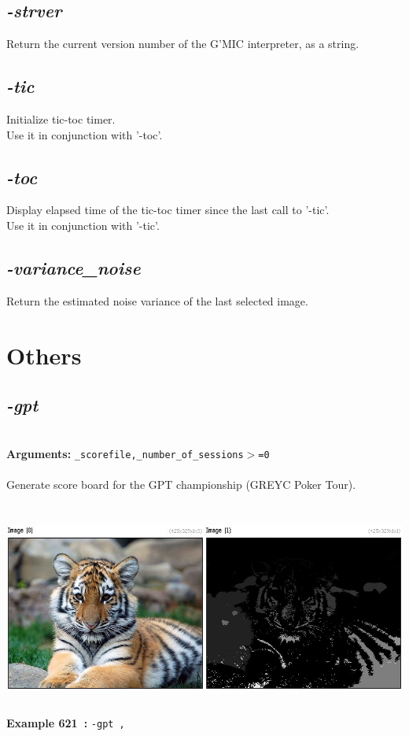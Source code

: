 \documentclass[a4paper,11pt,twoside]{book}
\begin{document}
\subsection{\emph{-strver} }\vspace*{-0.5em}
Return the current version number of the G'MIC interpreter, as a string.


\subsection{\emph{-tic} }\vspace*{-0.5em}
Initialize tic-toc timer.
~\\Use it in conjunction with '-toc'.


\subsection{\emph{-toc} }\vspace*{-0.5em}
Display elapsed time of the tic-toc timer since the last call to '-tic'.
~\\Use it in conjunction with '-tic'.


\subsection{\emph{-variance\_noise} }\vspace*{-0.5em}
Return the estimated noise variance of the last selected image.

\section{Others}


\subsection{\emph{-gpt} }\vspace*{-0.5em}
~\\\textbf{Arguments: } 
{\small \texttt{\_scorefile,\_number\_of\_sessions$>$=0}}\\~\\
Generate score board for the GPT championship (GREYC Poker Tour).
\begin{center}\includegraphics[keepaspectratio=true,height=7cm,width=\textwidth]{img/gmic_def621.jpg}\\
{\footnotesize \textbf{Example 621~:} \texttt{-gpt ,}}
\end{center}
\end{document}
